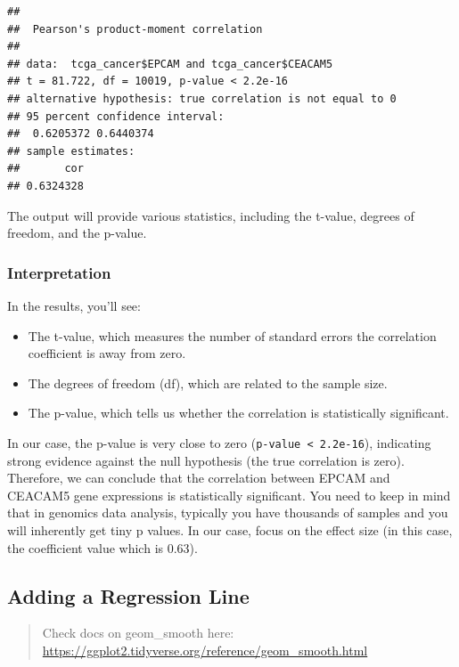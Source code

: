 \documentclass[
]{book}
\begin{document}
\begin{verbatim}
## 
##  Pearson's product-moment correlation
## 
## data:  tcga_cancer$EPCAM and tcga_cancer$CEACAM5
## t = 81.722, df = 10019, p-value < 2.2e-16
## alternative hypothesis: true correlation is not equal to 0
## 95 percent confidence interval:
##  0.6205372 0.6440374
## sample estimates:
##       cor 
## 0.6324328
\end{verbatim}

The output will provide various statistics, including the t-value, degrees of freedom, and the p-value.

\hypertarget{interpretation-1}{%
\subsubsection{Interpretation}\label{interpretation-1}}

In the results, you'll see:

\begin{itemize}
\item
  The t-value, which measures the number of standard errors the correlation coefficient is away from zero.
\item
  The degrees of freedom (df), which are related to the sample size.
\item
  The p-value, which tells us whether the correlation is statistically significant.
\end{itemize}

In our case, the p-value is very close to zero (\texttt{p-value\ \textless{}\ 2.2e-16}), indicating strong evidence against the null hypothesis (the true correlation is zero). Therefore, we can conclude that the correlation between EPCAM and CEACAM5 gene expressions is statistically significant. You need to keep in mind that in genomics data analysis, typically you have thousands of samples and you will inherently get tiny p values. In our case, focus on the effect size (in this case, the coefficient value which is 0.63).

\hypertarget{adding-a-regression-line}{%
\subsection{Adding a Regression Line}\label{adding-a-regression-line}}

\begin{quote}
Check docs on geom\_smooth here: \url{https://ggplot2.tidyverse.org/reference/geom_smooth.html}
\end{quote}
\end{document}
